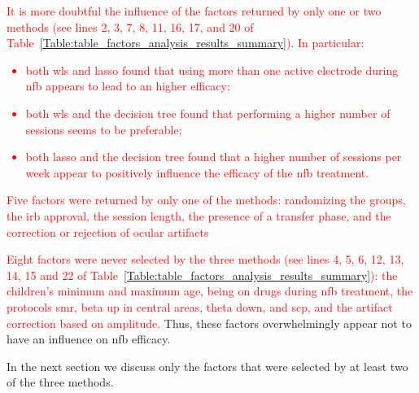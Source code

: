 \textcolor{red}{It is more doubtful the influence of the factors returned by only one or two methods (see lines 2, 3, 7, 8, 11, 16, 17, and 20
of Table~\ref{Table:table_factors_analysis_results_summary}). In particular: 
\begin{itemize}
\item both \gls{wls} and \gls{lasso} found that using more than one active electrode during \gls{nfb} appears to lead to an higher efficacy;
\item both \gls{wls} and the decision tree found that performing a higher number of sessions seems to be preferable;
\item both \gls{lasso} and the decision tree found that a higher number of sessions per week appear to positively influence the efficacy of the \gls{nfb} treatment.
\end{itemize}
Five factors were returned by only one of the methods: randomizing the groups, the \gls{irb} approval, the session length, the presence of a transfer phase, 
and the correction or rejection of ocular artifacts}

\textcolor{red}{Eight factors were never selected by the three methods (see lines 4, 5, 6, 12, 13, 14, 15 and 22 of 
Table~\ref{Table:table_factors_analysis_results_summary}): the children's minimum and maximum age, being on drugs during \gls{nfb} treatment,
the protocols \gls{smr}, beta up in central areas, theta down, and \gls{scp}, and the artifact correction based on amplitude.}
Thus, these factors overwhelmingly appear not to have an influence on \gls{nfb} efficacy. 

In the next section we discuss only the factors that were selected by at least two of the three methods. 

